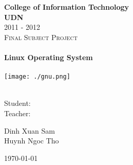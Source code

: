 \begin{titlepage}
	\begin{center}
		\huge{\textbf{College of Information Technology}} \\
		\textbf{\Large{UDN}} \\
		2011 - 2012 \\[1.5cm]
		\textsc{\Large Final Subject Project} \\ [0.5cm]
		\HRule \\[0.5cm]
		\textbf{\Huge{Linux Operating System}} \\[0.5cm]
		\HRule \\[0.5cm]
		\texttt{[image: ./gnu.png]} \\ 
		\hrulefill \\ [1.5cm]
		\begin{minipage}{0.4\textwidth}
			\begin{flushleft}
				\large{Student:} \\
				\large{Teacher:} \\
			\end{flushleft}
		\end{minipage}
		\begin{minipage}{0.4\textwidth}
			\begin{flushleft}
				\normalsize{Dinh Xuan Sam} \\
				\normalsize{Huynh Ngoc Tho}
			\end{flushleft}
		\end{minipage}
		\vfill
		{\large \today}
	\end{center}
\end{titlepage}

